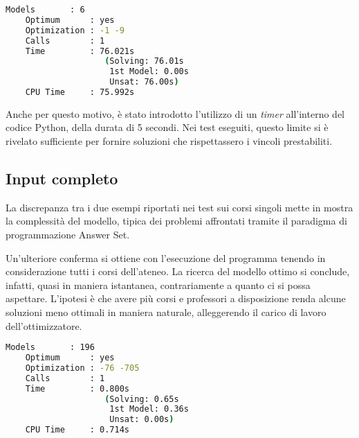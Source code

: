 \begin{lstlisting}[language=bash, captionpos=b, 
    caption={Statistiche clingo per il corso 3024.}, 
    label={lst:stat_3024},
    backgroundcolor=\color{lightgray!20},
    basicstyle=\ttfamily\footnotesize]
    Models       : 6
    Optimum      : yes
    Optimization : -1 -9
    Calls        : 1
    Time         : 76.021s 
                    (Solving: 76.01s 
                     1st Model: 0.00s 
                     Unsat: 76.00s)
    CPU Time     : 75.992s
\end{lstlisting}

Anche per questo motivo, è stato introdotto l'utilizzo di un \textit{timer} all'interno 
del codice Python, della durata di 5 secondi.
Nei test eseguiti, questo limite si è rivelato sufficiente per fornire soluzioni 
che rispettassero i vincoli prestabiliti.

\subsection{Input completo}
La discrepanza tra i due esempi riportati nei test sui corsi singoli mette in 
mostra la complessità del modello, tipica dei problemi affrontati tramite il 
paradigma di programmazione Answer Set.

Un'ulteriore conferma si ottiene con l'esecuzione del programma tenendo in 
considerazione tutti i corsi dell'ateneo. La ricerca del modello ottimo 
si conclude, infatti, quasi in maniera istantanea, contrariamente a quanto 
ci si possa aspettare.
L'ipotesi è che avere più corsi e professori a disposizione renda alcune soluzioni 
meno ottimali in maniera naturale, alleggerendo il carico di lavoro
dell'ottimizzatore.

\begin{lstlisting}[language=bash, captionpos=b, 
    caption={Statistiche clingo per tutti i corsi.}, 
    label={lst:stat_all},
    backgroundcolor=\color{lightgray!20},
    basicstyle=\ttfamily\footnotesize]
    Models       : 196
    Optimum      : yes
    Optimization : -76 -705
    Calls        : 1
    Time         : 0.800s 
                    (Solving: 0.65s 
                     1st Model: 0.36s 
                     Unsat: 0.00s)
    CPU Time     : 0.714s
\end{lstlisting}

